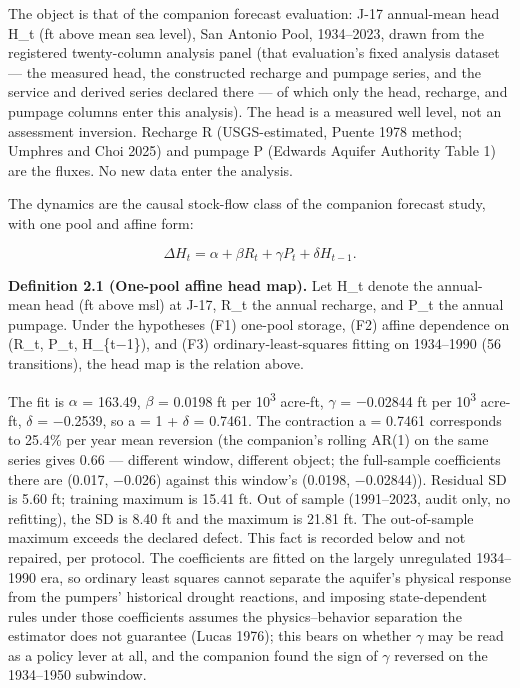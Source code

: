 \documentclass[11pt]{article}
\begin{document}
The object is that of the companion forecast evaluation: J-17
annual-mean head H\_t (ft above mean sea level), San Antonio Pool,
1934--2023, drawn from the registered twenty-column analysis panel
(that evaluation's fixed analysis dataset --- the measured head, the
constructed recharge and pumpage series, and the service and derived
series declared there --- of which only the head, recharge, and pumpage
columns enter this analysis). The
head is a measured well level, not an assessment inversion. Recharge R
(USGS-estimated, Puente 1978 method; Umphres and Choi 2025) and pumpage
P (Edwards Aquifer Authority Table 1) are the fluxes. No new data enter
the analysis.

The dynamics are the causal stock-flow class of the companion forecast
study, with one pool and affine form:

\[\Delta H_t = \alpha + \beta R_t + \gamma P_t + \delta H_{t-1}.\]

\textbf{Definition 2.1 (One-pool affine head map).} Let H\_t denote the
annual-mean head (ft above msl) at J-17, R\_t the annual recharge, and
P\_t the annual pumpage. Under the hypotheses (F1) one-pool storage,
(F2) affine dependence on (R\_t, P\_t, H\_\{t\ensuremath{-}1\}), and (F3)
ordinary-least-squares fitting on 1934--1990 (56 transitions), the head
map is the relation above.

The fit is \ensuremath{\alpha} = 163.49, \ensuremath{\beta} = 0.0198 ft per 10\textsuperscript{3} acre-ft, \ensuremath{\gamma} = \ensuremath{-}0.02844 ft
per 10\textsuperscript{3} acre-ft, \ensuremath{\delta} = \ensuremath{-}0.2539, so a = 1 + \ensuremath{\delta} = 0.7461. The contraction a =
0.7461 corresponds to 25.4\% per year mean reversion (the companion's
rolling AR(1) on the same series gives 0.66 --- different window,
different object; the full-sample coefficients there are (0.017, \ensuremath{-}0.026)
against this window's (0.0198, \ensuremath{-}0.02844)). Residual SD is 5.60 ft;
training maximum is 15.41 ft. Out of sample (1991--2023, audit only, no
refitting), the SD is 8.40 ft and the maximum is 21.81 ft. The
out-of-sample maximum exceeds the declared defect. This fact is recorded
below and not repaired, per protocol. The coefficients are fitted on the
largely unregulated 1934--1990 era, so ordinary least squares cannot
separate the aquifer's physical response from the pumpers' historical
drought reactions, and imposing state-dependent rules under those
coefficients assumes the physics--behavior separation the estimator does
not guarantee (Lucas 1976); this bears on whether \ensuremath{\gamma} may be read as a
policy lever at all, and the companion found the sign of \ensuremath{\gamma} reversed on
the 1934--1950 subwindow.
\end{document}
